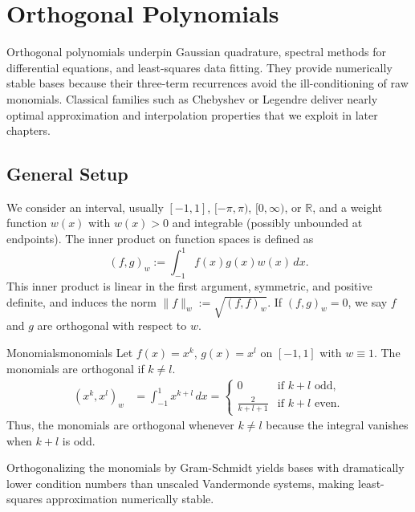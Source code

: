 \chapter{Orthogonal Polynomials}

Orthogonal polynomials underpin Gaussian quadrature, spectral methods for differential equations, and least-squares data fitting.
They provide numerically stable bases because their three-term recurrences avoid the ill-conditioning of raw monomials.
Classical families such as Chebyshev or Legendre deliver nearly optimal approximation and interpolation properties that we exploit in later chapters.

\section{General Setup}
We consider an interval, usually $[-1,1]$, $[-\pi,\pi)$, $[0,\infty)$, or $\mathbb{R}$, and a weight function $w(x)$ with $w(x) > 0$ and integrable (possibly unbounded at endpoints). The inner product on function spaces is defined as
\begin{equation}\label{eq:inner-product}
    (f, g)_w := \int_{-1}^1 f(x)g(x)w(x)\,dx.
\end{equation}
This inner product is linear in the first argument, symmetric, and positive definite, and induces the norm $\|f\|_w := \sqrt{(f, f)_w}$. If $(f, g)_w = 0$, we say $f$ and $g$ are orthogonal with respect to $w$.

\begin{example}{Monomials}{monomials}
    Let $f(x) = x^k$, $g(x) = x^l$ on $[-1,1]$ with $w \equiv 1$. The monomials are orthogonal if $k \neq l$.
    \begin{align*}
        (x^k, x^l)_w & = \int_{-1}^1 x^{k+l}\,dx = \begin{cases}
                                                       0               & \text{if } k+l \text{ odd},  \\
                                                       \frac{2}{k+l+1} & \text{if } k+l \text{ even}.
                                                   \end{cases}
    \end{align*}
    Thus, the monomials are orthogonal whenever $k \neq l$ because the integral vanishes when $k+l$ is odd.

    Orthogonalizing the monomials by Gram-Schmidt yields bases with dramatically lower condition numbers than unscaled Vandermonde systems, making least-squares approximation numerically stable.
\end{example}

